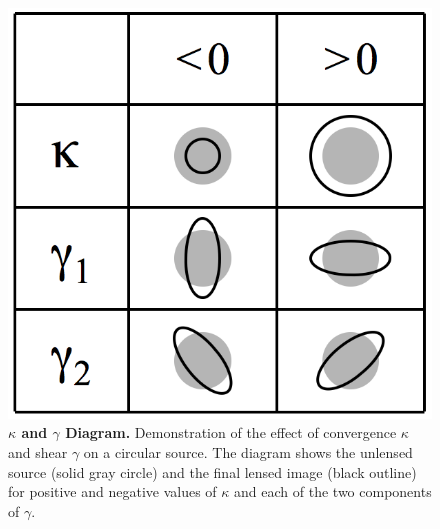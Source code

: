 \begin{figure}
\begin{center}
\includegraphics[scale=0.3]{plots_intro/KappaGamma.png}
\caption[$\kappa$ and $\gamma$ Diagram]{{\bf $\kappa$ and $\gamma$ Diagram.} Demonstration of the effect of convergence $\kappa$ and shear $\gamma$ on a circular source. The diagram shows the unlensed source (solid gray circle) and the final lensed image (black outline) for positive and negative values of $\kappa$ and each of the two components of $\gamma$.}
\label{plot:kappagamma}
\end{center}
\end{figure}

